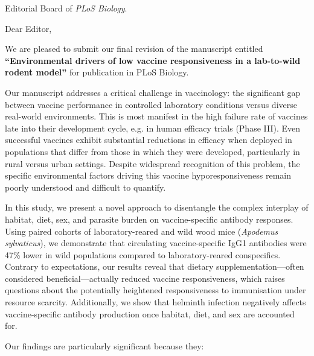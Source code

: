 \documentclass[11pt, a4paper]{letter} %
\begin{document}

\begin{letter}{
    Editorial Board of \emph{PLoS Biology}.
}


\opening{Dear Editor,}

We are pleased to submit our final revision of the manuscript entitled \textbf{``Environmental drivers of low vaccine responsiveness in a lab-to-wild rodent model''} for publication in PLoS Biology.

Our manuscript addresses a critical challenge in vaccinology: the significant gap between vaccine performance in controlled laboratory conditions versus diverse real-world environments. This is most manifest in the high failure rate of vaccines late into their development cycle, e.g. in human efficacy trials (Phase III). Even successful vaccines exhibit substantial reductions in efficacy when deployed in populations that differ from those in which they were developed, particularly in rural versus urban settings. Despite widespread recognition of this problem, the specific environmental factors driving this vaccine hyporesponsiveness remain poorly understood and difficult to quantify.

In this study, we present a novel approach to disentangle the complex interplay of habitat, diet, sex, and parasite burden on vaccine-specific antibody responses. Using paired cohorts of laboratory-reared and wild wood mice (\textit{Apodemus sylvaticus}), we demonstrate that circulating vaccine-specific IgG1 antibodies were 47\% lower in wild populations compared to laboratory-reared conspecifics. Contrary to expectations, our results reveal that dietary supplementation—often considered beneficial—actually reduced vaccine responsiveness, which raises questions about the potentially heightened responsiveness to immunisation under resource scarcity. Additionally, we show that helminth infection negatively affects vaccine-specific antibody production once habitat, diet, and sex are accounted for.

Our findings are particularly significant because they:


\end{letter}
\end{document}
